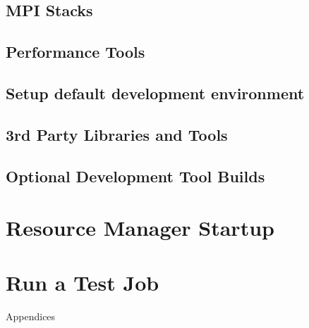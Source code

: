 \documentclass[letterpaper]{article}
\begin{document}
\subsection{MPI Stacks} \label{sec:mpi}


\subsection{Performance Tools} \label{sec:install_perf_tools}


\subsection{Setup default development environment}


\vspace*{0.3cm}
\subsection{3rd Party Libraries and Tools} \label{sec:3rdparty}



\vspace*{0.1cm}


\vspace*{.6cm}
\subsection{Optional Development Tool Builds} \label{sec:3rdparty_intel}


\section{Resource Manager Startup} \label{sec:rms_startup}


\section{Run a Test Job} \label{sec:test_job}


\clearpage
\appendix
{\bf \LARGE \centerline{Appendices}} \vspace*{0.2cm}

\renewcommand{\thesubsection}{\Alph{subsection}}







\end{document}
